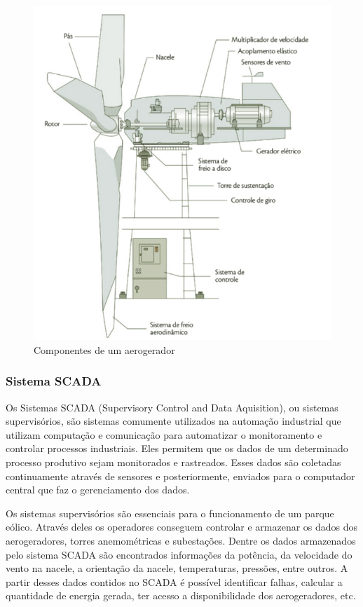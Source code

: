 \begin{figure}[htbp!] \begin{center}
\includegraphics[width=0.75\linewidth]{./figuras/ilustracao-aerogerador}
\caption{Componentes de um aerogerador}
\label{Fig:ilustracaoAerogerador}
\end{center} 
\end{figure}

\subsubsection{Sistema SCADA}
\label{Sec:scada}

Os Sistemas SCADA (Supervisory Control and Data Aquisition), ou sistemas supervisórios, são sistemas comumente utilizados na automação industrial que utilizam computação e comunicação para automatizar o monitoramento e controlar processos industriais. Eles permitem que os dados de um determinado processo produtivo sejam monitorados e rastreados. Esses dados são coletadas continuamente através de sensores e posteriormente, enviados para o computador central que faz o gerenciamento dos dados.

Os sistemas supervisórios são essenciais para o funcionamento de um parque eólico. Através deles os operadores conseguem controlar e armazenar os dados dos aerogeradores, torres anemométricas e subestações. Dentre os dados armazenados pelo sistema SCADA são encontrados informações da potência, da velocidade do vento na nacele, a orientação da nacele, temperaturas, pressões, entre outros. A partir desses dados contidos no SCADA é possível identificar falhas, calcular a quantidade de energia gerada, ter acesso a disponibilidade dos aerogeradores, etc.


